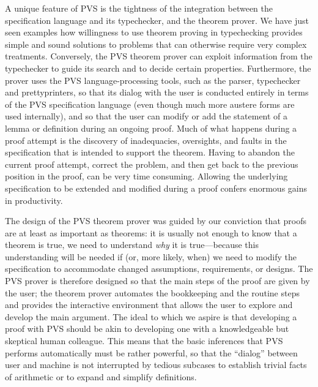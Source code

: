 {A unique feature of PVS is the tightness of the integration between
the specification language and its typechecker, and the theorem
prover.  We have just seen examples how willingness to use theorem
proving in typechecking provides simple and sound solutions to
problems that can otherwise require very complex treatments.
Conversely, the PVS theorem prover can exploit information from the
typechecker to guide its search and to decide certain properties.
Furthermore, the prover uses the PVS language-processing tools, such
as the parser, typechecker and prettyprinters, so that its dialog
with the user is conducted entirely in terms of the PVS specification
language (even though much more austere forms are used internally),
and so that the user can modify or add the statement of a lemma or
definition during an ongoing proof.  Much of what happens during a
proof attempt is the discovery of inadequacies, oversights, and
faults in the specification that is intended to support the theorem.
Having to abandon the current proof attempt, correct the problem, and
then get back to the previous position in the proof, can be very time
consuming.  Allowing the underlying specification to be extended and
modified during a proof confers enormous gains in productivity.

The design of the PVS theorem prover was guided by our conviction
that proofs are at least as important as theorems: it is usually not
enough to know that a theorem is true, we need to understand {\em
why\/} it is true---because this understanding will be needed if (or,
more likely, when) we need to modify the specification to accommodate
changed assumptions, requirements, or designs.  The PVS prover is
therefore designed so that the main steps of the proof are given by
the user; the theorem prover automates the bookkeeping and the routine
steps and provides the interactive environment that allows the user
to explore and develop the main argument.  The ideal to which we
aspire is that developing a proof with PVS should be akin to
developing one with a knowledgeable but skeptical human colleague.
This means that the basic inferences that PVS performs automatically
must be rather powerful, so that the ``dialog'' between user and
machine is not interrupted by tedious subcases to establish trivial
facts of arithmetic or to expand and simplify definitions.

}
